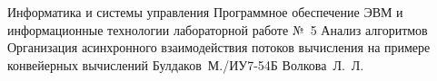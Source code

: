 \documentclass{bmstu}[a4paper]
\begin{document}
\makereporttitle
{Информатика и системы управления} %
{Программное обеспечение ЭВМ и информационные технологии} %
{лабораторной работе №~5} %
{Анализ алгоритмов} %
{Организация асинхронного взаимодействия потоков вычисления на примере конвейерных вычислений} %
{} %
{Булдаков~М./ИУ7-54Б} %
{Волкова~Л.~Л.} %

\maketableofcontents





%
%


\makebibliography

%
\end{document}
